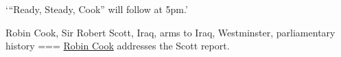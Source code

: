 ‘“Ready, Steady, Cook” will follow at 5pm.’

Robin Cook, Sir Robert Scott, Iraq, arms to Iraq, Westminster, parliamentary history
===
\href{https://youtu.be/i8OOYoBRbRI?feature=shared&t=4949}{Robin Cook} addresses the Scott report.